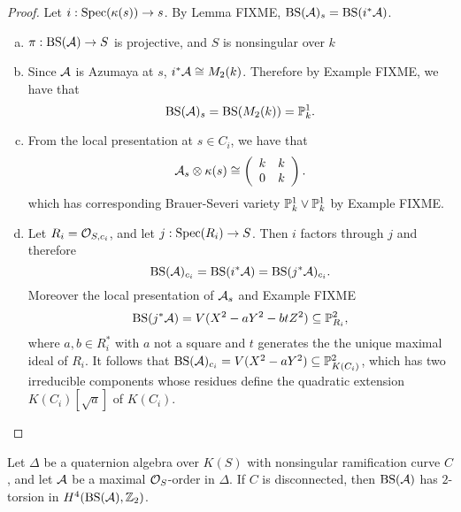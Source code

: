 \begin{proof} Let $i: \textnormal{Spec}(\kappa(s))\rightarrow s$.  By Lemma FIXME, $\textnormal{BS}(\mathcal{A})_s = \textnormal{BS}(i^*\mathcal{A})$.
\begin{enumerate}[(a)]
\item  $\pi: \textnormal{BS}(\mathcal{A})\rightarrow S$ is projective, and $S$ is nonsingular over $k$
\item  Since $\mathcal{A}$ is Azumaya at $s$, $i^*\mathcal{A}\cong M_2(k)$.  Therefore by Example FIXME, we have that
$$\textnormal{BS}(\mathcal{A})_s = \textnormal{BS}(M_2(k)) = \mathbb{P}^1_k.$$
\item
From the local presentation at $s\in C_i$, we have that
$$\mathcal{A}_s\otimes\kappa(s) \cong\left(\begin{array}{cc}
k & k\\
0 & k
\end{array}\right).$$
which has corresponding Brauer-Severi variety $\mathbb{P}^1_k\vee\mathbb{P}^1_k$ by Example FIXME.
\item
Let $R_i = \mathcal{O}_{S,c_i}$, and let $j: \textnormal{Spec}(R_i)\rightarrow S$.  Then $i$ factors through $j$ and therefore
$$\textnormal{BS}(\mathcal{A})_{c_i} = \textnormal{BS}(i^*\mathcal{A}) = \textnormal{BS}(j^*\mathcal{A})_{c_i}.$$
Moreover the local presentation of $\mathcal{A}_s$ and Example FIXME
$$\textnormal{BS}(j^*\mathcal{A}) = V(X^2 - aY^2 - btZ^2)\subseteq \mathbb{P}^2_{R_i},$$
where $a,b\in R_i^*$ with $a$ not a square and $t$ generates the the unique maximal ideal of $R_i$.  It follows that $\textnormal{BS}(\mathcal{A})_{c_i} = V(X^2-aY^2)\subseteq \mathbb{P}^2_{K(C_i)}$, which has two irreducible components whose residues define the quadratic extension $K(C_i)[\sqrt{a}]$ of $K(C_i)$.
\end{enumerate}
\end{proof}

\begin{prop}
Let $\Delta$ be a quaternion algebra over $K(S)$ with nonsingular ramification curve $C$, and let $\mathcal{A}$ be a maximal $\mathcal{O}_S$-order in $\Delta$.  If $C$ is disconnected, then $\textnormal{BS}(\mathcal{A})$ has $2$-torsion in $H^4(\textnormal{BS}(\mathcal{A}),\mathbb{Z}_2)$.
\end{prop}


